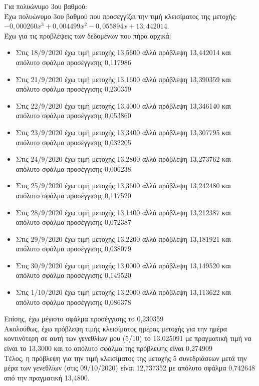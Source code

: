 \documentclass[a4paper,11pt]{article}
\newcommand{\lt}{\latintext}
\begin{document}
\par 
Για πολυώνυμο 3ου βαθμού:\\

Έχω πολυώνυμο 3ου βαθμού που προσεγγίζει την τιμή κλεισίματος της μετοχής: {\lt $-0,000260x^3 + 0,004499x^2 -0,055894x + 13,442014$}.\\


Έχω για τις προβλέψεις των δεδομένων που πήρα αρχικά:
\begin{itemize}
    \item Στις 18/9/2020 έχω τιμή μετοχής 13,5600 αλλά πρόβλεψη 13,442014 και απόλυτο σφάλμα προσέγγισης 0,117986
    \item Στις 21/9/2020 έχω τιμή μετοχής 13,1600 αλλά πρόβλεψη 13,390359 και απόλυτο σφάλμα προσέγγισης 0,230359
    \item Στις 22/9/2020 έχω τιμή μετοχής 13,4000 αλλά πρόβλεψη 13,346140 και απόλυτο σφάλμα προσέγγισης 0,053860
    \item Στις 23/9/2020 έχω τιμή μετοχής 13,3400 αλλά πρόβλεψη 13,307795 και απόλυτο σφάλμα προσέγγισης 0,032205
    \item Στις 24/9/2020 έχω τιμή μετοχής 13,2800 αλλά πρόβλεψη 13,273762 και απόλυτο σφάλμα προσέγγισης 0,006238
    \item Στις 25/9/2020 έχω τιμή μετοχής 13,3600 αλλά πρόβλεψη 13,242480 και απόλυτο σφάλμα προσέγγισης 0,117520
    \item Στις 28/9/2020 έχω τιμή μετοχής 13,1400 αλλά πρόβλεψη 13,212387 και απόλυτο σφάλμα προσέγγισης 0,072387
    \item Στις 29/9/2020 έχω τιμή μετοχής 13,2200 αλλά πρόβλεψη 13,181921 και απόλυτο σφάλμα προσέγγισης 0,038079
    \item Στις 30/9/2020 έχω τιμή μετοχής 13,0000 αλλά πρόβλεψη 13,149520 και απόλυτο σφάλμα προσέγγισης 0,149520
    \item Στις 1/10/2020 έχω τιμή μετοχής 13,2000 αλλά πρόβλεψη 13,113622 και απόλυτο σφάλμα προσέγγισης 0,086378
\end{itemize}
Επίσης, έχω μέγιστο σφάλμα προσέγγισης το 0,230359\\

Ακολούθως, έχω πρόβλεψη τιμής κλεισίματος ημέρας μετοχής για την ημέρα κοντινότερη σε αυτή των γενεθλίων μου (5/10) το 13,025091 με πραγματική τιμή να είναι το 13,3000 και το απόλυτο σφάλμα της πρόβλεψης είναι 0,274909\\

Τέλος, η πρόβλεψη για την τιμή κλεισίματος της μετοχής 5 συνεδριάσεων μετά την μέρα των γενεθλίων (στις 09/10/2020) είναι 12,737352 με απόλυτο σφάλμα 0,742648 από την πραγματική 13,4800.\\
\end{document}

